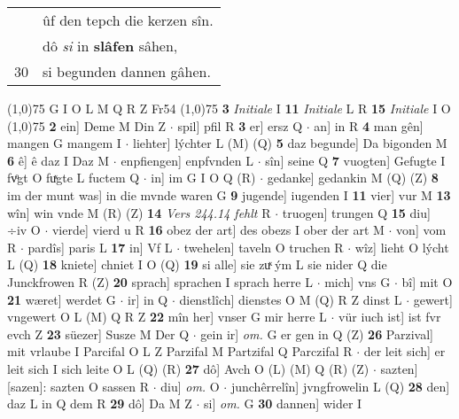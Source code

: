 \documentclass[8pt,a4paper,notitlepage]{article}
\begin{document}
\begin{table}[ht]
\begin{minipage}[t]{0.5\linewidth}
\begin{tabular}{rl}
 & ûf den tepch die kerzen sîn.\\ 
 & dô \textit{si} in \textbf{slâfen} sâhen,\\ 
30 & si begunden dannen gâhen.\\ 
\end{tabular}
\scriptsize
\line(1,0){75} \newline
G I O L M Q R Z Fr54 \newline
\line(1,0){75} \newline
\textbf{3} \textit{Initiale} I  \textbf{11} \textit{Initiale} L R  \textbf{15} \textit{Initiale} I O  \newline
\line(1,0){75} \newline
\textbf{2} ein] Deme M Din Z  $\cdot$ spil] pfil R \textbf{3} er] ersz Q  $\cdot$ an] in R \textbf{4} man gên] mangen G mangem I  $\cdot$ liehter] lýchter L (M) (Q) \textbf{5} daz begunde] Da bigonden M \textbf{6} ê] ê daz I Daz M  $\cdot$ enpfiengen] enpfvnden L  $\cdot$ sîn] seine Q \textbf{7} vuogten] Gefugte I fvͦgt O fuͯgte L fuctem Q  $\cdot$ in] im G I O Q (R)  $\cdot$ gedanke] gedankin M (Q) (Z) \textbf{8} im der munt was] in die mvnde waren G \textbf{9} jugende] iugenden I \textbf{11} vier] vur M \textbf{13} wîn] win vnde M (R) (Z) \textbf{14} \textit{Vers 244.14 fehlt} R   $\cdot$ truogen] trungen Q \textbf{15} diu] ÷iv O  $\cdot$ vierde] vierd u R \textbf{16} obez der art] des obezs I ober der art M  $\cdot$ von] vom R  $\cdot$ pardîs] paris L \textbf{17} in] Vf L  $\cdot$ twehelen] taveln O truchen R  $\cdot$ wîz] lieht O lýcht L (Q) \textbf{18} kniete] chniet I O (Q) \textbf{19} si alle] sie zuͯ ým L sie nider Q die Junckfrowen R (Z) \textbf{20} sprach] sprachen I sprach herre L  $\cdot$ mich] vns G  $\cdot$ bî] mit O \textbf{21} wæret] werdet G  $\cdot$ ir] in Q  $\cdot$ dienstlîch] dienstes O M (Q) R Z dinst L  $\cdot$ gewert] vngewert O L (M) Q R Z \textbf{22} mîn her] vnser G mir herre L  $\cdot$ vür iuch ist] ist fvr evch Z \textbf{23} süezer] Susze M Der Q  $\cdot$ gein ir] \textit{om.} G er gen in Q (Z) \textbf{26} Parzival] mit vrlaube I Parcifal O L Z Parzifal M Partzifal Q Parczifal R  $\cdot$ der leit sich] er leit sich I sich leite O L (Q) (R) \textbf{27} dô] Avch O (L) (M) Q (R) (Z)  $\cdot$ sazten] [sazen]: sazten O sassen R  $\cdot$ diu] \textit{om.} O  $\cdot$ junchêrrelîn] jvngfrowelin L (Q) \textbf{28} den] daz L in Q dem R \textbf{29} dô] Da M Z  $\cdot$ si] \textit{om.} G \textbf{30} dannen] wider I \newline
\end{minipage}
\hspace{0.5cm}

\end{table}
\end{document}
